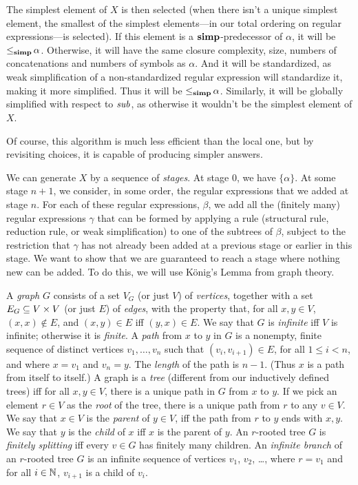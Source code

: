 The simplest element of $X$ is then selected (when there isn't a
unique simplest element, the smallest of the simplest elements---in
our total ordering on regular expressions---is selected).  If this
element is a $\mathrel{\mathbf{simp}}$-predecessor of $\alpha$, it will be
${\mathrel{\leq_{\mathbf{simp}}}}\,\alpha$. Otherwise, it will have the same closure
complexity, size, numbers of concatenations and numbers of symbols as
$\alpha$. And it will be standardized, as weak simplification of a
non-standardized regular expression will standardize it, making it
more simplified. Thus it will be ${\mathrel{\leq_{\mathbf{simp}}}}\,\alpha$.  Similarly, it
will be globally simplified with respect to ${\it sub}$, as otherwise it
wouldn't be the simplest element of $X$.

Of course, this algorithm is much less efficient than the local one,
but by revisiting choices, it is capable of producing simpler answers.

We can generate $X$ by a sequence of \emph{stages}. At stage $0$, we
have $\{\alpha\}$. At some stage $n+1$, we consider, in some order,
the regular expressions that we added at stage $n$. For each of these
regular expressions, $\beta$, we add all the (finitely many) regular
expressions $\gamma$ that can be formed by applying a rule (structural
rule, reduction rule, or weak simplification) to one of the subtrees
of $\beta$, subject to the restriction that $\gamma$ has not already
been added at a previous stage or earlier in this stage.  We want to
show that we are guaranteed to reach a stage where nothing new can be
added. To do this, we will use K\"onig's Lemma
%
from graph theory.

A \emph{graph} $G$ consists of a set $V_G$ (or just $V$) of
\emph{vertices}, together with a set $E_G\subseteq V\times V$ (or just $E$) of
\emph{edges}, with the property that, for all $x, y\in V$,
$(x, x)\not\in E$, and $(x,y)\in E$ iff $(y, x)\in E$.  We say that
$G$ is \emph{infinite} iff $V$ is infinite; otherwise it is
\emph{finite}.  A \emph{path} from $x$ to $y$ in $G$ is a nonempty,
finite sequence of distinct vertices $v_1,\ldots,v_n$ such that
$(v_i, v_{i + 1})\in E$, for all $1\leq i < n$, and where $x = v_1$
and $v_n = y$. The \emph{length} of the path is $n-1$.  (Thus $x$ is a
path from itself to itself.) A graph is a \emph{tree} (different from
our inductively defined trees) iff for all $x,y\in V$, there is a
unique path in $G$ from $x$ to $y$. If we pick an element $r\in V$ as
the \emph{root} of the tree, there is a unique path from $r$ to any
$v\in V$. We say that $x\in V$ is the \emph{parent} of $y\in V$, iff
the path from $r$ to $y$ ends with $x, y$. We say that $y$ is the
\emph{child} of $x$ iff $x$ is the parent of $y$.  An $r$-rooted tree
$G$ is \emph{finitely splitting} iff every $v\in G$ has finitely many
children.  An \emph{infinite branch} of an $r$-rooted tree $G$ is an
infinite sequence of vertices $v_1$, $v_2$, \ldots, where $r = v_1$
and for all $i\in\mathbb{N}$, $v_{i+1}$ is a child of $v_i$.


